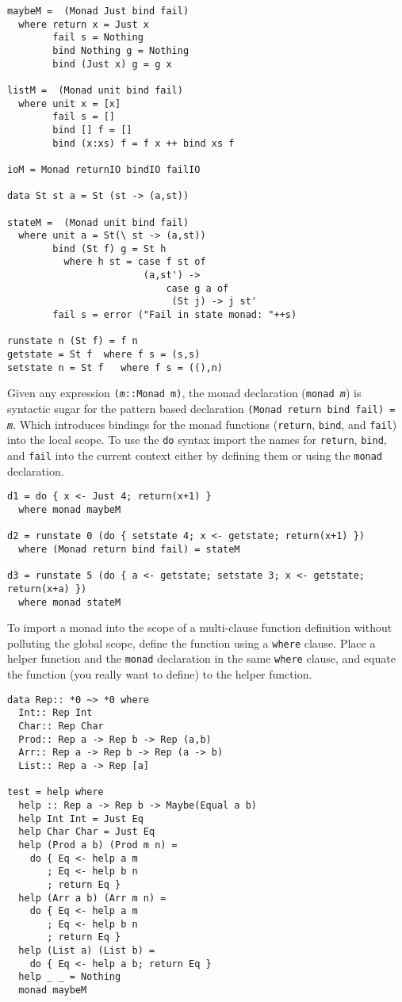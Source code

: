\documentclass[11pt,twoside]{article}
\begin{document}
\begin{multicols}{2}
{\small
\begin{verbatim}
maybeM =  (Monad Just bind fail)
  where return x = Just x
        fail s = Nothing
        bind Nothing g = Nothing
        bind (Just x) g = g x         
        
listM =  (Monad unit bind fail)
  where unit x = [x]
        fail s = []
        bind [] f = []
        bind (x:xs) f = f x ++ bind xs f

ioM = Monad returnIO bindIO failIO

data St st a = St (st -> (a,st)) 

stateM =  (Monad unit bind fail)
  where unit a = St(\ st -> (a,st))
        bind (St f) g = St h
          where h st = case f st of
                        (a,st') -> 
                            case g a of
                             (St j) -> j st'
        fail s = error ("Fail in state monad: "++s)

runstate n (St f) = f n
getstate = St f  where f s = (s,s)
setstate n = St f   where f s = ((),n)
\end{verbatim}}
\end{multicols}



Given any expression {\tt ({\it m}::Monad m)}, the monad declaration
({\tt monad {\it m}}) is syntactic sugar for the pattern based
declaration {\tt (Monad return bind fail) = {\it m}}. Which
introduces bindings for the monad functions
({\tt return}, {\tt bind}, and {\tt fail}) into the local scope.
To use the {\tt do} syntax import the names for {\tt return},
{\tt bind}, and {\tt fail} into the current context either by
defining them or using the {\tt monad} declaration.
\begin{verbatim}
d1 = do { x <- Just 4; return(x+1) }
  where monad maybeM

d2 = runstate 0 (do { setstate 4; x <- getstate; return(x+1) })
  where (Monad return bind fail) = stateM

d3 = runstate 5 (do { a <- getstate; setstate 3; x <- getstate; return(x+a) })
  where monad stateM
\end{verbatim}
To import a monad into the scope of a multi-clause function definition without
polluting the global scope, define the function using a {\tt where} clause.
Place a helper function and the {\tt monad} declaration in the same {\tt where}
clause, and equate the function (you really want to define) to the helper function.

\begin{verbatim}
data Rep:: *0 ~> *0 where
  Int:: Rep Int
  Char:: Rep Char
  Prod:: Rep a -> Rep b -> Rep (a,b)
  Arr:: Rep a -> Rep b -> Rep (a -> b)
  List:: Rep a -> Rep [a]

test = help where    
  help :: Rep a -> Rep b -> Maybe(Equal a b)
  help Int Int = Just Eq
  help Char Char = Just Eq
  help (Prod a b) (Prod m n) =
    do { Eq <- help a m
       ; Eq <- help b n
       ; return Eq } 
  help (Arr a b) (Arr m n) =
    do { Eq <- help a m
       ; Eq <- help b n
       ; return Eq }     
  help (List a) (List b) = 
    do { Eq <- help a b; return Eq } 
  help _ _ = Nothing
  monad maybeM 
\end{verbatim}
\end{document}
